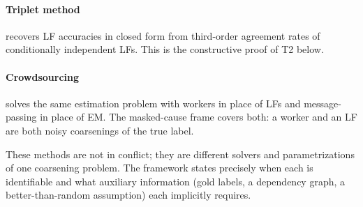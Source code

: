 \paragraph{Triplet method \citep{fu2020fast}} recovers LF accuracies
in closed form from third-order agreement rates of conditionally
independent LFs. This is the constructive proof of T2 below.

\paragraph{Crowdsourcing \citep{karger2011iterative}} solves the same
estimation problem with workers in place of LFs and message-passing
in place of EM. The masked-cause frame covers both: a worker and an
LF are both noisy coarsenings of the true label.

These methods are not in conflict; they are different solvers and
parametrizations of one coarsening problem. The framework states
precisely when each is identifiable and what auxiliary information
(gold labels, a dependency graph, a better-than-random assumption)
each implicitly requires.
